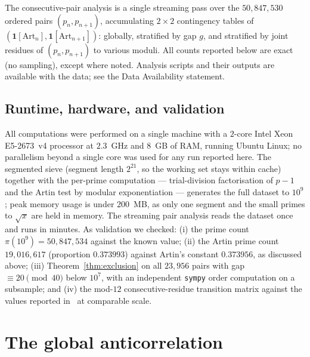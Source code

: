 \documentclass[11pt]{amsart}
\theoremstyle{definition}
\newcommand{\Art}{\mathrm{Art}}
\begin{document}
\begin{sloppypar}
The consecutive-pair analysis is a single streaming pass over the
$50{,}847{,}530$ ordered pairs $(p_n, p_{n+1})$, accumulating $2 \times 2$
contingency tables of $(\mathbf{1}[\Art_n], \mathbf{1}[\Art_{n+1}])$:
globally, stratified by gap $g$, and stratified by joint residues of
$(p_n, p_{n+1})$ to various moduli. All counts reported below are exact
(no sampling), except where noted. Analysis scripts and their outputs are
available with the data; see the Data Availability statement.
\end{sloppypar}

\subsection*{Runtime, hardware, and validation}
All computations were performed on a single machine with a $2$-core Intel Xeon
E5-2673~v4 processor at $2.3$~GHz and $8$~GB of RAM, running Ubuntu Linux; no
parallelism beyond a single core was used for any run reported here. The
segmented sieve (segment length $2^{21}$, so the working set stays within
cache) together with the per-prime computation --- trial-division
factorisation of $p - 1$ and the Artin test by modular exponentiation ---
generates the full dataset to $10^9$; peak memory usage is
under $200$~MB, as only one segment and the small primes to $\sqrt{x}$ are
held in memory. The streaming pair analysis reads the dataset once and runs in
minutes. As validation we checked: (i) the prime count $\pi(10^9) =
	50{,}847{,}534$ against the known value; (ii) the Artin prime count
$19{,}016{,}617$ (proportion $0.373993$) against Artin's constant
$0.373956$, as discussed above; (iii) Theorem~\ref{thm:exclusion} on all
$23{,}956$ pairs with gap $\equiv 20 \pmod{40}$ below $10^7$, with an
independent \texttt{sympy} order computation on a subsample; and (iv) the
mod-$12$ consecutive-residue transition matrix against the values reported
in~\cite{LOS2016} at comparable scale.

\section{The global anticorrelation}
\label{sec:global}
\end{document}
